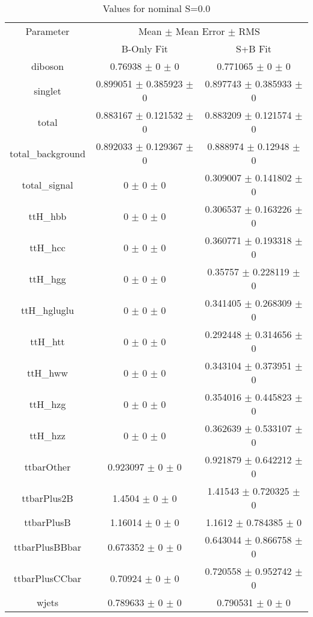 \begin{table}
\centering
\caption{Values for nominal S=0.0}
\begin{tabular}{ccc}
\toprule
Parameter & \multicolumn{2}{c}{Mean $\pm$ Mean Error $\pm$ RMS}\\
 & B-Only Fit & S+B Fit\\
\midrule
diboson & \num{0.76938} $\pm$ \num{0} $\pm$ \num{0} & \num{0.771065} $\pm$ \num{0} $\pm$ \num{0}\\
singlet & \num{0.899051} $\pm$ \num{0.385923} $\pm$ \num{0} & \num{0.897743} $\pm$ \num{0.385933} $\pm$ \num{0}\\
total & \num{0.883167} $\pm$ \num{0.121532} $\pm$ \num{0} & \num{0.883209} $\pm$ \num{0.121574} $\pm$ \num{0}\\
total\_background & \num{0.892033} $\pm$ \num{0.129367} $\pm$ \num{0} & \num{0.888974} $\pm$ \num{0.12948} $\pm$ \num{0}\\
total\_signal & \num{0} $\pm$ \num{0} $\pm$ \num{0} & \num{0.309007} $\pm$ \num{0.141802} $\pm$ \num{0}\\
ttH\_hbb & \num{0} $\pm$ \num{0} $\pm$ \num{0} & \num{0.306537} $\pm$ \num{0.163226} $\pm$ \num{0}\\
ttH\_hcc & \num{0} $\pm$ \num{0} $\pm$ \num{0} & \num{0.360771} $\pm$ \num{0.193318} $\pm$ \num{0}\\
ttH\_hgg & \num{0} $\pm$ \num{0} $\pm$ \num{0} & \num{0.35757} $\pm$ \num{0.228119} $\pm$ \num{0}\\
ttH\_hgluglu & \num{0} $\pm$ \num{0} $\pm$ \num{0} & \num{0.341405} $\pm$ \num{0.268309} $\pm$ \num{0}\\
ttH\_htt & \num{0} $\pm$ \num{0} $\pm$ \num{0} & \num{0.292448} $\pm$ \num{0.314656} $\pm$ \num{0}\\
ttH\_hww & \num{0} $\pm$ \num{0} $\pm$ \num{0} & \num{0.343104} $\pm$ \num{0.373951} $\pm$ \num{0}\\
ttH\_hzg & \num{0} $\pm$ \num{0} $\pm$ \num{0} & \num{0.354016} $\pm$ \num{0.445823} $\pm$ \num{0}\\
ttH\_hzz & \num{0} $\pm$ \num{0} $\pm$ \num{0} & \num{0.362639} $\pm$ \num{0.533107} $\pm$ \num{0}\\
ttbarOther & \num{0.923097} $\pm$ \num{0} $\pm$ \num{0} & \num{0.921879} $\pm$ \num{0.642212} $\pm$ \num{0}\\
ttbarPlus2B & \num{1.4504} $\pm$ \num{0} $\pm$ \num{0} & \num{1.41543} $\pm$ \num{0.720325} $\pm$ \num{0}\\
ttbarPlusB & \num{1.16014} $\pm$ \num{0} $\pm$ \num{0} & \num{1.1612} $\pm$ \num{0.784385} $\pm$ \num{0}\\
ttbarPlusBBbar & \num{0.673352} $\pm$ \num{0} $\pm$ \num{0} & \num{0.643044} $\pm$ \num{0.866758} $\pm$ \num{0}\\
ttbarPlusCCbar & \num{0.70924} $\pm$ \num{0} $\pm$ \num{0} & \num{0.720558} $\pm$ \num{0.952742} $\pm$ \num{0}\\
wjets & \num{0.789633} $\pm$ \num{0} $\pm$ \num{0} & \num{0.790531} $\pm$ \num{0} $\pm$ \num{0}\\
\bottomrule
\end{tabular}
\end{table}